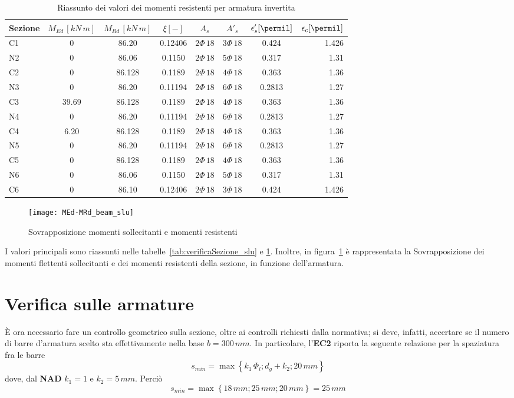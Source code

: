 \begin{table}
	\centering
	\caption{Riassunto dei valori dei momenti resistenti per armatura invertita}
	\label{tab:verificaSezioneInvertita_slu}
	\begin{tabular*}{\textwidth}{l @{\extracolsep{\fill}} ccccccr}
		\toprule
		Sezione &  $M_{Ed}\,[kN\,m]$ &  $M_{Rd}\,[kN\,m]$ & $\xi [-]$ &$A_s$ &$A'_s$&$\epsilon'_s [\permil]$ &$\epsilon_c [\permil]$\\
		\midrule
		C1 &0& 86.20&0.12406& $2\Phi\,18$&$3\Phi\,18$&0.424&1.426\\
		N2 &0&86.06&0.1150&$2\Phi\,18$&$5\Phi\,18$&0.317&1.31\\
		C2 &0&86.128&0.1189&$2\Phi\,18$&$4\Phi\,18$&0.363&1.36\\
		N3 &0&86.20&0.11194 &$2\Phi\,18$&$6\Phi\,18$&0.2813&1.27\\
		C3 &39.69 &86.128&0.1189 &$2\Phi\,18$&$4\Phi\,18$&0.363&1.36\\
		N4 &0&86.20&0.11194&$2\Phi\,18$&$6\Phi\,18$&0.2813&1.27\\
		C4 &6.20&86.128&0.1189&$2\Phi\,18$&$4\Phi\,18$&0.363&1.36\\
		N5&0&86.20&0.11194&$2\Phi\,18$&$6\Phi\,18$&0.2813&1.27 \\
		C5 &0&86.128&0.1189&$2\Phi\,18$&$4\Phi\,18$&0.363&1.36\\
		N6 &0&86.06&0.1150&$2\Phi\,18$&$5\Phi\,18$&0.317&1.31\\
		C6 &0&86.10&0.12406&$2\Phi\,18$&$3\Phi\,18$&0.424&1.426\\
		\bottomrule
	\end{tabular*}
\end{table}

\begin{figure}
    \centering
	\texttt{[image: MEd-MRd\_beam\_slu]}
	\caption{Sovrapposizione momenti sollecitanti e momenti resistenti}
	\label{fig:MEd-MRd}
\end{figure}

I valori principali sono riassunti nelle tabelle~\ref{tab:verificaSezione_slu} e \ref{tab:verificaSezioneInvertita_slu}. Inoltre, in figura~\ref{fig:MEd-MRd} è rappresentata la Sovrapposizione dei momenti flettenti sollecitanti e dei momenti resistenti della sezione, in funzione dell'armatura.

\section{Verifica sulle armature}
\`E ora necessario fare un controllo geometrico sulla sezione, oltre ai controlli richiesti dalla normativa; si deve, infatti, accertare se il numero di barre d'armatura scelto sta effettivamente nella base $b = 300\,mm$. In particolare, l'\textbf{EC2} riporta la seguente relazione per la spaziatura fra le barre
\[
s_{min} = \max\left\{k_1\,\Phi_l; d_g + k_2; 20\,mm\right\}
\]
dove, dal \textbf{NAD} $k_1 = 1$ e $k_2 = 5\,mm$. Perciò
\[
s_{min} = \max\left\{18\,mm; 25\,mm ; 20\,mm\right\} = 25\,mm
\]

